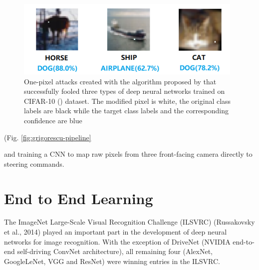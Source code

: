 \begin{figure}[ht]
 \centering 
 \includegraphics[scale=1]{Figures/one-pixel-attack.png}
 \caption{One-pixel  attacks  created  with the algorithm proposed by \cite{Su_2019} that  successfully  fooled  three  types  of deep neural networks trained  on  CIFAR-10 (\cite{CIFAR_10}) dataset. The modified pixel is white, the original  class  labels  are   black while  the  target  class  labels  and  the corresponding confidence are blue}
 \label{fig:one-pixel-attack}
\end{figure}


(Fig. \ref{fig:grigorescu-pipeline} 

and training a CNN to map raw pixels from three front-facing camera directly to steering commands.





\section{End to End Learning}

The  ImageNet Large-Scale Visual Recognition Challenge (ILSVRC) (Russakovsky et al., 2014) played an important part in the development of deep neural networks for image recognition. With the exception of DriveNet (NVIDIA end-to-end self-driving ConvNet architecture), all remaining four (AlexNet, GoogleLeNet, VGG and ResNet) were winning entries in the ILSVRC.  



